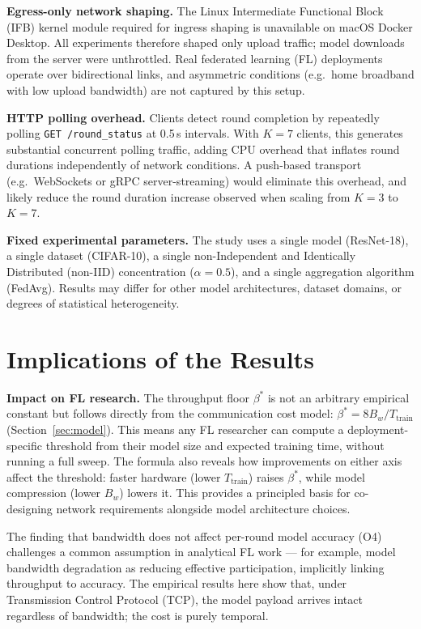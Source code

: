 \documentclass[12pt,a4paper]{report}
\begin{document}
\textbf{Egress-only network shaping.}
The Linux Intermediate Functional Block (IFB) kernel module required for
ingress shaping is unavailable on macOS Docker Desktop.  All experiments
therefore shaped only upload traffic; model downloads from the server were
unthrottled.  Real federated learning (FL) deployments operate over
bidirectional links, and asymmetric conditions (e.g.\ home broadband with
low upload bandwidth) are not captured by this setup.

\textbf{HTTP polling overhead.}
Clients detect round completion by repeatedly polling
\texttt{GET /round\_status} at 0.5\,s intervals.  With $K = 7$ clients,
this generates substantial concurrent polling traffic, adding CPU overhead
that inflates round durations independently of network conditions.  A
push-based transport (e.g.\ WebSockets or gRPC server-streaming) would
eliminate this overhead, and likely reduce the round duration increase
observed when scaling from $K = 3$ to $K = 7$.

\textbf{Fixed experimental parameters.}
The study uses a single model (ResNet-18), a single dataset (CIFAR-10), a
single non-Independent and Identically Distributed (non-IID) concentration
($\alpha = 0.5$), and a single aggregation algorithm (FedAvg).  Results
may differ for other model architectures, dataset domains, or degrees of
statistical heterogeneity.

\section{Implications of the Results}

\textbf{Impact on FL research.}
The throughput floor $\beta^*$ is not an arbitrary empirical constant but
follows directly from the communication cost model: $\beta^* = 8 B_w /
T_{\mathrm{train}}$ (Section~\ref{sec:model}).  This means any FL
researcher can compute a deployment-specific threshold from their model
size and expected training time, without running a full sweep.  The
formula also reveals how improvements on either axis affect the threshold:
faster hardware (lower $T_{\mathrm{train}}$) raises $\beta^*$, while model
compression (lower $B_w$) lowers it.  This provides a principled basis
for co-designing network requirements alongside model architecture choices.

The finding that bandwidth does not affect per-round model accuracy
(O4) challenges a common assumption in analytical FL work --- for example,
\citet{lim2020federated} model bandwidth degradation as
reducing effective participation, implicitly linking throughput to accuracy.
The empirical results here show that, under Transmission Control Protocol
(TCP), the model payload arrives intact regardless of bandwidth; the cost
is purely temporal.
\end{document}
